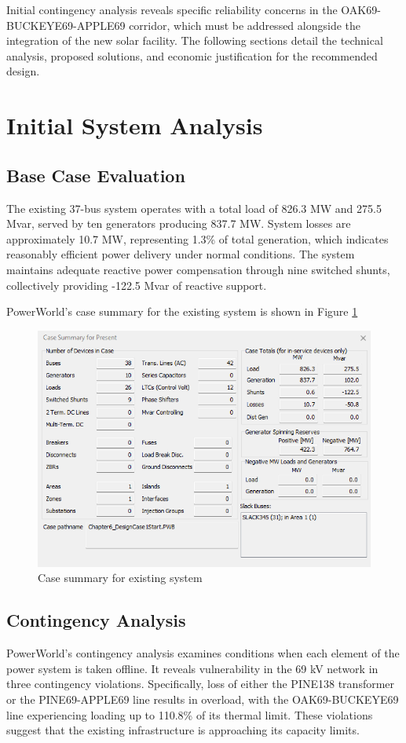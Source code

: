\documentclass[conference]{IEEEtran}
\begin{document}
Initial contingency analysis reveals specific reliability concerns in the OAK69-BUCKEYE69-APPLE69 corridor, which must be addressed alongside the integration of the new solar facility. The following sections detail the technical analysis, proposed solutions, and economic justification for the recommended design.

\section{Initial System Analysis}
\subsection{Base Case Evaluation}
The existing 37-bus system operates with a total load of 826.3 MW and 275.5 Mvar, served by ten generators producing 837.7 MW. System losses are approximately 10.7 MW, representing 1.3\% of total generation, which indicates reasonably efficient power delivery under normal conditions. The system maintains adequate reactive power compensation through nine switched shunts, collectively providing -122.5 Mvar of reactive support.

PowerWorld's case summary for the existing system is shown in Figure \ref{fig:casesummaryexisting}
\begin{figure}[tbph]
	\centering
	\includegraphics[width=1\linewidth]{figures/case_summary_existing}
	\caption{Case summary for existing system}
	\label{fig:casesummaryexisting}
\end{figure}
\subsection{Contingency Analysis}
PowerWorld's contingency analysis examines conditions when each element of the power system is taken offline. It reveals vulnerability in the 69 kV network in three contingency violations. Specifically, loss of either the PINE138 transformer or the PINE69-APPLE69 line results in overload, with the OAK69-BUCKEYE69 line experiencing loading up to 110.8\% of its thermal limit. These violations suggest that the existing infrastructure is approaching its capacity limits. 
\end{document}

